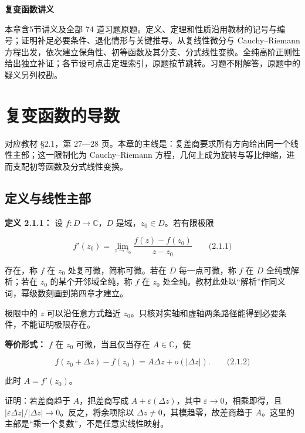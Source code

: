 \documentclass[11pt,a4paper]{article}
\begin{document}
\begin{center}
{\LARGE\bfseries 复变函数讲义\par}
\vspace{8pt}{\large 第二章\quad 全纯函数\par}
\vspace{6pt}{\small 依史济怀、刘太顺《复变函数》\quad 教材第 27—67 页\par}
\end{center}\vspace{8pt}
本章含5节讲义及全部 74 道习题原题。定义、定理和性质沿用教材的记号与编号；证明补足必要条件、退化情形与关键推导。从复线性微分与 Cauchy--Riemann 方程出发，依次建立保角性、初等函数及其分支、分式线性变换。全纯高阶正则性给出独立补证；各节设可点击定理索引，原题按节跳转。习题不附解答，原题中的疑义另列校勘。
\tableofcontents\clearpage
\section{复变函数的导数}
对应教材 §2.1，第 27---28
页。本章的主线是：复差商要求所有方向给出同一个线性主部；这一限制化为
Cauchy--Riemann
方程，几何上成为旋转与等比伸缩，进而支配初等函数及分式线性变换。

\subsection{定义与线性主部}\label{ch02-s1-ux5b9aux4e49ux4e0eux7ebfux6027ux4e3bux90e8}

\textbf{定义 2.1.1：} 设 \(f:D\to\mathbb C\)，\(D\)
是域，\(z_0\in D\)。若有限极限

\[
f'(z_0)=\lim_{z\to z_0}\frac{f(z)-f(z_0)}{z-z_0}
\qquad\text{(2.1.1)}
\]

存在，称 \(f\) 在 \(z_0\) 处复可微，简称可微。若在 \(D\) 每一点可微，称
\(f\) 在 \(D\) 全纯或解析；若在 \(z_0\) 的某个开邻域全纯，称 \(f\) 在
\(z_0\) 处全纯。教材此处以``解析''作同义词，幂级数刻画到第四章才建立。

极限中的 \(z\) 可以沿任意方式趋近
\(z_0\)。只核对实轴和虚轴两条路径能得到必要条件，不能证明极限存在。

\textbf{等价形式：} \(f\) 在 \(z_0\) 可微，当且仅当存在
\(A\in\mathbb C\)，使

\[
f(z_0+\Delta z)-f(z_0)=A\Delta z+o(|\Delta z|).
\qquad\text{(2.1.2)}
\]

此时 \(A=f'(z_0)\)。

证明：若差商趋于 \(A\)，把差商写成 \(A+\varepsilon(\Delta z)\)，其中
\(\varepsilon\to0\)，相乘即得，且
\(|\varepsilon\Delta z|/|\Delta z|\to0\)。反之，将余项除以
\(\Delta z\ne0\)，其模趋零，故差商趋于
\(A\)。这里的主部是``乘一个复数''，不是任意实线性映射。
\end{document}
